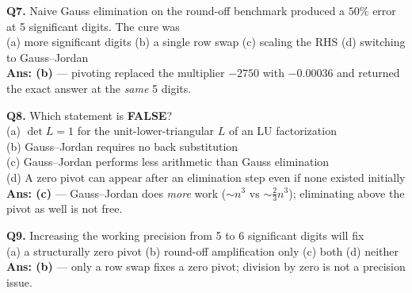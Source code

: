 \begin{mcqbox}
\textbf{Q7.} Naive Gauss elimination on the round-off benchmark produced a $50\%$ error at 5 significant digits. The cure was\\
(a) more significant digits \quad (b) a single row swap \quad (c) scaling the RHS \quad (d) switching to Gauss--Jordan\\
\textbf{Ans: (b)} --- pivoting replaced the multiplier $-2750$ with $-0.00036$ and returned the exact answer at the \emph{same} 5 digits.

\textbf{Q8.} Which statement is \textbf{FALSE}?\\
(a) $\det L = 1$ for the unit-lower-triangular $L$ of an LU factorization\\
(b) Gauss--Jordan requires no back substitution\\
(c) Gauss--Jordan performs less arithmetic than Gauss elimination\\
(d) A zero pivot can appear after an elimination step even if none existed initially\\
\textbf{Ans: (c)} --- Gauss--Jordan does \emph{more} work ($\sim n^3$ vs $\sim\frac23n^3$); eliminating above the pivot as well is not free.

\textbf{Q9.} Increasing the working precision from 5 to 6 significant digits will fix\\
(a) a structurally zero pivot \quad (b) round-off amplification only \quad (c) both \quad (d) neither\\
\textbf{Ans: (b)} --- only a row swap fixes a zero pivot; division by zero is not a precision issue.
\end{mcqbox}

